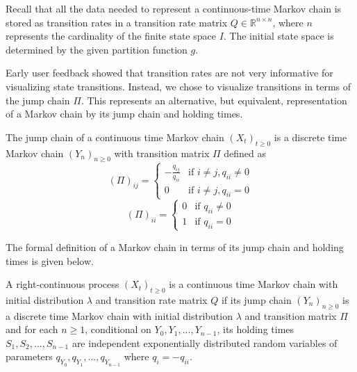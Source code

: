Recall that all the data needed to represent a continuous-time Markov chain
is stored as transition rates in a transition rate matrix $Q \in \mathbb{R}^{n \times n}$, where $n$ represents
the cardinality of the finite state space $I$. The initial state space is determined by the given partition function $g$.

Early user feedback showed that transition rates are not very informative for visualizing state transitions. Instead, 
we chose to visualize transitions in terms of the jump chain $\Pi$.
This represents an alternative, but equivalent, representation of a Markov chain by its jump chain and holding times. 

The jump chain of a continuous time Markov chain $(X_t)_{t \ge 0}$ is
a discrete time Markov chain $(Y_n)_{n \ge 0}$ with transition matrix $\Pi$ defined as
\begin{equation}
	\nonumber
	\left(\Pi\right)_{ij} = 
		\left\{
			\begin{array}{ll}
				-\frac{q_{ij}}{q_{ii}} & \mbox{if } i \ne j, q_{ii} \ne 0 \\
				0 & \mbox{if } i \ne j, q_{ii} = 0
			\end{array}
		\right.
\end{equation}
\begin{equation}
	\nonumber
	\left(\Pi\right)_{ii} = 
		\left\{
			\begin{array}{ll}
				0 & \mbox{if } q_{ii} \ne 0 \\
				1 & \mbox{if } q_{ii} = 0
			\end{array}
		\right.
\end{equation}

The formal definition of a Markov chain in terms of its jump chain and holding times is given below.
\begin{defn}
	\label{def:jump-chain-holding-times}
	A right-continuous process $(X_t)_{t \ge 0}$ is a continuous time Markov chain with initial
	distribution $\lambda$ and transition rate matrix $Q$ if its jump chain $(Y_n)_{n \ge 0}$ is a 
	discrete time Markov chain with initial distribution $\lambda$ and transition matrix $\Pi$ and
	for each $n \ge 1$, conditional on $Y_0, Y_1, ..., Y_{n-1}$, its holding times $S_1, S_2, ..., S_{n-1}$
	are independent exponentially distributed random variables of parameters $q_{Y_0}, q_{Y_1}, ..., q_{Y_{n-1}}$
	where $q_i = -q_{ii}$.
\end{defn}


